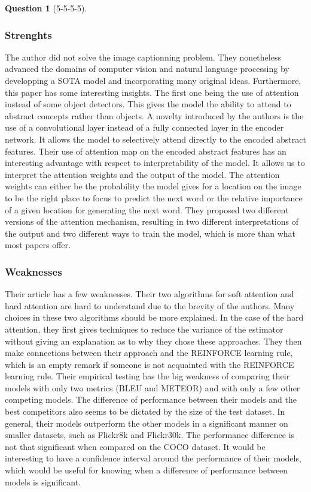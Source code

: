 \documentclass[12pt]{article}
\theoremstyle{definition}
\newtheorem{exercise}{Question}%
\begin{document}
\begin{exercise}[5-5-5-5]
{    \subsubsection*{Strenghts}
    The author did not solve the image captionning problem. They nonetheless
    advanced the domains of computer vision and natural language processing by
    developping a SOTA model and incorporating many original ideas. Furthermore,
    this paper has some interesting insights.  The first one being the use of
    attention instead of some object detectors.  This gives the model the ability to
    attend to abstract concepts rather than objects.  A novelty introduced by the
    authors is the use of a convolutional layer instead of a fully connected layer
    in the encoder network. It allows the model to selectively attend directly to
    the encoded abstract features.  Their use of attention map on the encoded
    abstract features has an interesting advantage with respect to interpretability
    of the model. It allows us to interpret the attention weights and the output of
    the model.  The attention weights can either be the probability the model gives
    for a location on the image to be the right place to focus to predict the next
    word or the relative importance of a given location for generating the next
    word.  They proposed two different versions of the attention mechanism,
    resulting in two different interpretations of the output and two different ways
    to train the model, which is more than what most papers offer.

    \subsubsection*{Weaknesses}
    Their article has a few weaknesses. Their two algorithms for soft attention
    and hard attention are hard to understand due to the brevity of the authors.
    Many choices in these two algorithms should be more explained. In the case
    of the hard attention, they first gives techniques to reduce the variance of
    the estimator without giving an explanation as to why they chose these
    approaches. They then make connections between their approach and the
    REINFORCE learning rule, which is an empty remark if someone is not
    acquainted with the REINFORCE learning rule.
    Their empirical testing has the big weakness of comparing their models with
    only two metrics (BLEU and METEOR) and with only a few other competing
    models. The difference of performance between their models and the best
    competitors also seems to be dictated by the size of the test dataset. In
    general, their models outperform the other models in a significant manner on
    smaller datasets, such as Flickr8k and Flickr30k. The performance difference
    is not that significant when compared on the COCO dataset. It would be
    interesting to have a confidence interval around the performance of their
    models, which would be useful for knowing when a difference of performance
    between models is significant.
}
\end{exercise}
\end{document}
